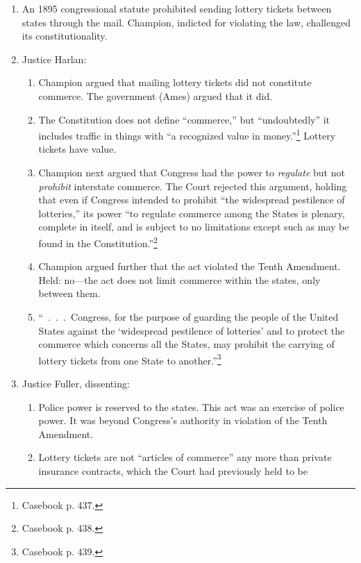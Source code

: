 \begin{enumerate}
    \item An 1895 congressional statute prohibited sending lottery tickets 
    between states through the mail. Champion, indicted for violating the law, 
    challenged its constitutionality.
    \item Justice Harlan:
    \begin{enumerate}
        \item Champion argued that mailing lottery tickets did not 
        constitute commerce. The government (Ames) argued that it did.
        \item The Constitution does not define ``commerce,'' but 
        ``undoubtedly'' it includes traffic in things with ``a recognized 
        value in money.''\footnote{Casebook p. 437.} Lottery tickets have 
        value.
        \item Champion next argued that Congress had the power to 
        \emph{regulate} but not \emph{prohibit} interstate commerce. The Court 
        rejected this argument, holding that even if Congress intended to 
        prohibit ``the widespread pestilence of lotteries,'' its power ``to 
        regulate commerce among the States is plenary, complete in itself, and 
        is subject to no limitations except such as may be found in the 
        Constitution.''\footnote{Casebook p. 438.}
        \item Champion argued further that the act violated the Tenth 
        Amendment. Held: no---the act does not limit commerce within the 
        states, only between them.
        \item ``~.~.~.~Congress, for the purpose of guarding the people of the 
        United States against the `widespread pestilence of lotteries' and to 
        protect the commerce which concerns all the States, may prohibit the 
        carrying of lottery tickets from one State to 
        another.''\footnote{Casebook p. 439.}
    \end{enumerate}
    \item Justice Fuller, dissenting:
    \begin{enumerate}
        \item Police power is reserved to the states. This act was an exercise 
        of police power. It was beyond Congress's authority in violation of 
        the Tenth Amendment.
        \item Lottery tickets are not ``articles of commerce'' any more than 
        private insurance contracts, which the Court had previously held to be 

\end{enumerate}
\end{enumerate}
